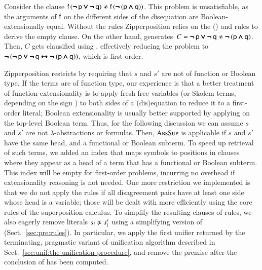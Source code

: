 Consider the clause $\cst{f} \, (\inot\cst{p} \ior \inot\cst{q}) \noteq \cst{f} \,
(\inot (\cst{p} \iand \cst{q}))$. This problem is unsatisfiable, as
the arguments of $\mathsf{f}$ on the different sides of the disequation are Boolean-extensionally
equal. Without the  rules Zipperposition relies on the
() and  rules to derive the empty
clause. On the other hand,  generates~$C = \inot\cst{p} \ior \inot\cst{q} \noteq
\inot (\cst{p} \iand \cst{q})$. Then, $C$ gets clausified using
, effectively reducing the problem to $\pmb{\neg\,} (\pmb{\neg\,}\mathsf{p} \pmb{\lor}
\pmb{\neg\,}\mathsf{q} \pmb{\leftrightarrow} \pmb{\neg\,} (\mathsf{p} \pmb{\land} \mathsf{q}))$, which is first-order.

\begin{sloppypar}
  Zipperposition restricts  by
  requiring that $s$ and $s'$ are not of function or Boolean type. If the terms are of function type, our experience is
  that a better treatment of function extensionality is to apply fresh free
  variables (or Skolem terms, depending on the sign
  \cite{bbtvw-21-sup-lam}) to both sides of a (dis)equation to reduce it to
  a first-order literal; Boolean extensionality is usually better supported by
  applying  on the top-level Boolean term. Thus, for the following
  discussion we can assume $s$ and $s'$ are not $\lambda$-abstractions or formulas. Then, $\textsc{AbsSup}$ is applicable if $s$
  and $s'$ have the same head, and a functional or Boolean subterm. To speed up
  retrieval of such terms, we added an index that maps symbols to positions in
  clauses where they appear as a head of a term that has a functional or Boolean
  subterm. This index will be empty for first-order problems, incurring no
  overhead if extensionality reasoning is not needed. One more restriction we implemented is that we do not apply the  rules if all
  disagreement pairs have at least one side whose head is a variable; those will
  be dealt with more efficiently using the core rules of the superposition
  calculus. To simplify the resulting clauses of  rules, we also
  eagerly remove literals $s_i \not\approx s'_i$ using a simplifying version of
   (Sect.~\ref{sec:pre:rules}). In particular, we apply the first
  unifier returned by the terminating, pragmatic variant of unification
  algorithm described in Sect.~\ref{sec:unif:the-unification-procedure}, and
  remove the premise after the conclusion of  has been computed.
\end{sloppypar}

